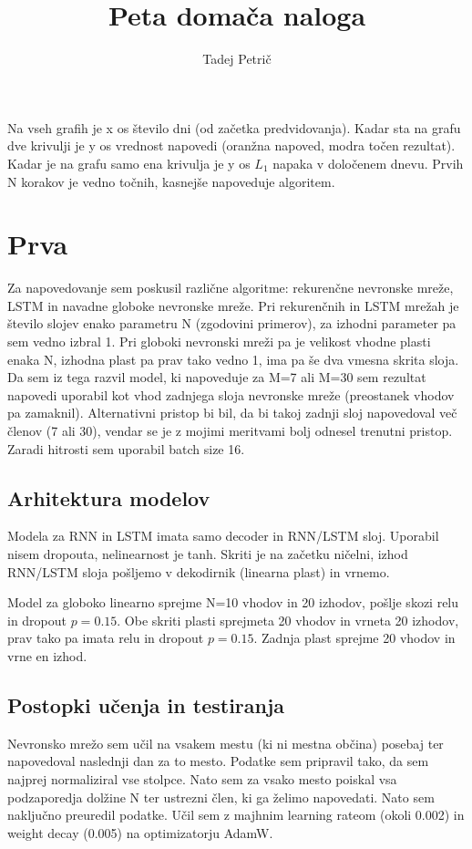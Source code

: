 \documentclass{article}
\begin{document}
\title{Peta domača naloga}
\author{Tadej Petrič}
\maketitle
Na vseh grafih je x os število dni (od začetka predvidovanja). Kadar sta na grafu dve krivulji je y os vrednost napovedi (oranžna napoved, modra točen rezultat). Kadar je na grafu samo ena krivulja je y os \(L_1\) napaka v določenem dnevu. Prvih N korakov je vedno točnih, kasnejše napoveduje algoritem.

\section{Prva}
Za napovedovanje sem poskusil različne algoritme: rekurenčne nevronske mreže, LSTM in navadne globoke nevronske mreže. Pri rekurenčnih in LSTM mrežah je število slojev enako parametru N (zgodovini primerov), za izhodni parameter pa sem vedno izbral 1. Pri globoki nevronski mreži pa je velikost vhodne plasti enaka N, izhodna plast pa prav tako vedno 1, ima pa še dva vmesna skrita sloja. Da sem iz tega razvil model, ki napoveduje za M=7 ali M=30 sem rezultat napovedi uporabil kot vhod zadnjega sloja nevronske mreže (preostanek vhodov pa zamaknil). Alternativni pristop bi bil, da bi takoj zadnji sloj napovedoval več členov (7 ali 30), vendar se je z mojimi meritvami bolj odnesel trenutni pristop. Zaradi hitrosti sem uporabil batch size 16.

\subsection*{Arhitektura modelov}
Modela za RNN in LSTM imata samo decoder in RNN/LSTM sloj. Uporabil nisem dropouta, nelinearnost je tanh. Skriti je na začetku ničelni, izhod RNN/LSTM sloja pošljemo v dekodirnik (linearna plast) in vrnemo.

Model za globoko linearno sprejme N=10 vhodov in 20 izhodov, pošlje skozi relu in dropout \(p=0.15\). Obe skriti plasti sprejmeta 20 vhodov in vrneta 20 izhodov, prav tako pa imata relu in dropout \(p=0.15\). Zadnja plast sprejme 20 vhodov in vrne en izhod.

\subsection*{Postopki učenja in testiranja}
Nevronsko mrežo sem učil na vsakem mestu (ki ni mestna občina) posebaj ter napovedoval naslednji dan za to mesto. Podatke sem pripravil tako, da sem najprej normaliziral vse stolpce. Nato sem za vsako mesto poiskal vsa podzaporedja dolžine N ter ustrezni člen, ki ga želimo napovedati. Nato sem naključno preuredil podatke. Učil sem z majhnim learning rateom (okoli 0.002) in weight decay (0.005) na optimizatorju AdamW.
\end{document}
